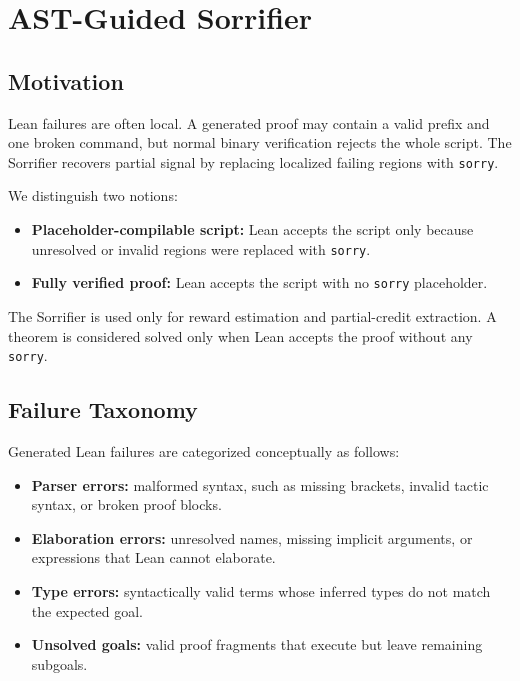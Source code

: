 \chapter{AST-Guided Sorrifier}
\label{sec:Sorrifier}

\section{Motivation}

Lean failures are often local. A generated proof may contain a valid prefix and one broken command, but normal binary verification rejects the whole script. The Sorrifier recovers partial signal by replacing localized failing regions with \texttt{sorry}.

We distinguish two notions:
\begin{itemize}
    \item \textbf{Placeholder-compilable script:} Lean accepts the script only because unresolved or invalid regions were replaced with \texttt{sorry}.
    \item \textbf{Fully verified proof:} Lean accepts the script with no \texttt{sorry} placeholder.
\end{itemize}
The Sorrifier is used only for reward estimation and partial-credit extraction. A theorem is considered solved only when Lean accepts the proof without any \texttt{sorry}.

\section{Failure Taxonomy}

Generated Lean failures are categorized conceptually as follows:
\begin{itemize}
    \item \textbf{Parser errors:} malformed syntax, such as missing brackets, invalid tactic syntax, or broken proof blocks.
    \item \textbf{Elaboration errors:} unresolved names, missing implicit arguments, or expressions that Lean cannot elaborate.
    \item \textbf{Type errors:} syntactically valid terms whose inferred types do not match the expected goal.
    \item \textbf{Unsolved goals:} valid proof fragments that execute but leave remaining subgoals.
\end{itemize}

